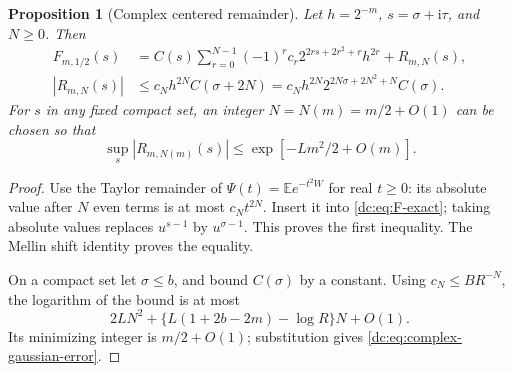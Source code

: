 \documentclass[11pt,a4paper,oneside,openany]{book}
\numberwithin{equation}{chapter}
\newtheorem{proposition}[theorem]{Proposition}
\theoremstyle{definition}
\theoremstyle{remark}
\newcommand{\E}{\mathbb E}
\newcommand{\ii}{\mathrm i}
\newcommand{\abs}[1]{\left\lvert #1\right\rvert}
\begin{document}
\begin{proposition}[Complex centered remainder]
\label{dc:prop:complex-center}
Let $h=2^{-m}$, $s=\sigma+\ii\tau$, and $N\ge0$. Then
\begin{align}
 F_{m,1/2}(s)
 &=C(s)\sum_{r=0}^{N-1}(-1)^rc_r
         2^{2rs+2r^2+r}h^{2r}+R_{m,N}(s),
 \label{dc:eq:center-complex-expansion}\\
 \abs{R_{m,N}(s)}
 &\le c_Nh^{2N}C(\sigma+2N)
 =c_Nh^{2N}2^{2N\sigma+2N^2+N}C(\sigma).
 \label{dc:eq:center-complex-bound}
\end{align}
For $s$ in any fixed compact set, an integer $N=N(m)=m/2+O(1)$
can be chosen so that
\begin{equation}
 \sup_s\abs{R_{m,N(m)}(s)}
 \le \exp[-Lm^2/2+O(m)].
 \label{dc:eq:complex-gaussian-error}
\end{equation}
\end{proposition}
\begin{proof}
Use the Taylor remainder of $\Psi(t)=\E e^{-t^2W}$ for real $t\ge0$:
its absolute value after $N$ even terms is at most $c_Nt^{2N}$.
Insert it into \cref{dc:eq:F-exact}; taking absolute values replaces
$u^{s-1}$ by $u^{\sigma-1}$. This proves the first inequality.
The Mellin shift identity proves the equality.

On a compact set let $\sigma\le b$, and bound $C(\sigma)$ by a
constant. Using $c_N\le BR^{-N}$, the logarithm of the bound is at
most
\[
 2LN^2+\{L(1+2b-2m)-\log R\}N+O(1).
\]
Its minimizing integer is $m/2+O(1)$; substitution gives
\cref{dc:eq:complex-gaussian-error}.
\end{proof}
\end{document}
